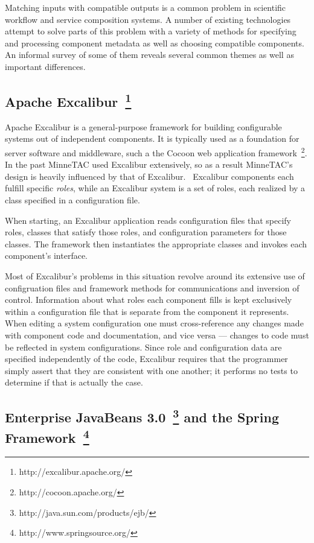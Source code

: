 \documentclass{elsart}
\begin{document}
Matching inputs with compatible outputs is a common problem in
scientific workflow and service composition systems.  A number of
existing technologies attempt to solve parts of this problem with a
variety of methods for specifying and processing component metadata as
well as choosing compatible components.  An informal survey of some of
them reveals several common themes as well as important differences.

\subsection{Apache Excalibur~\footnote{http://excalibur.apache.org/}}

Apache Excalibur is a general-purpose framework for building configurable
systems out of independent components.  It is typically used as a
foundation for server software and middleware, such a the Cocoon web
application framework~\footnote{http://cocoon.apache.org/}.  In the past
MinneTAC used Excalibur extensively, so as a result MinneTAC's design
is heavily influenced by that of Excalibur.~\cite{ecra07} Excalibur
components each fulfill specific \emph{roles}, while an Excalibur system
is a set of roles, each realized by a class specified in a configuration
file.

When starting, an Excalibur application reads configuration files that
specify roles, classes that satisfy those roles, and configuration
parameters for those classes.  The framework then instantiates the
appropriate classes and invokes each component's interface.

Most of Excalibur's problems in this situation revolve around
its extensive use of configruation files and framework methods for
communications and inversion of control.  Information about what roles
each component fills is kept exclusively within a configuration file
that is separate from the component it represents.  When editing a
system configuration one must cross-reference any changes made with
component code and documentation, and vice versa --- changes to code
must be reflected in system configurations.
Since role and configuration data are specified independently of the
code, Excalibur requires that the programmer simply assert that they
are consistent with one another; it performs no tests to determine if
that is actually the case.

\subsection{Enterprise JavaBeans
3.0~\footnote{http://java.sun.com/products/ejb/} and the Spring
Framework~\footnote{http://www.springsource.org/}}
\end{document}
